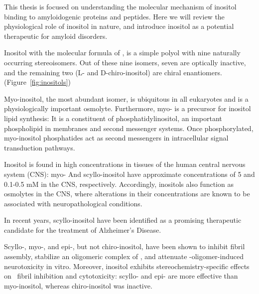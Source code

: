 This thesis is focused on understanding the molecular mechanism of inositol binding to amyloidogenic proteins and peptides. Here we will review the physiological role of inositol in nature, and introduce inositol as a potential therapeutic for amyloid disorders.

Inositol with the molecular formula of , is a simple polyol with nine naturally occurring stereoisomers. Out of these nine isomers, seven are optically inactive, and the remaining two (L- and D-chiro-inositol) are chiral enantiomers.(Figure~\ref{fig:inositols})


Myo-inositol, the most abundant isomer, is ubiquitous in all eukaryotes and is a physiologically important osmolyte.  Furthermore, myo- is a precursor for inositol lipid synthesis: It is a constituent of phosphatidylinositol, an important phospholipid in membranes and second messenger systems. Once phosphorylated, myo-inositol phosphatides act as second messengers in intracellular signal transduction pathways.\cite{Fisher:2002tk}

Inositol is found in high concentrations in tissues of the human central nervous system (CNS): myo- And scyllo-inositol have approximate concentrations of 5 and 0.1-0.5 mM in the CNS, respectively.\cite{Fisher:2002tk} Accordingly, inositols also function as osmolytes in the CNS, where alterations in their concentrations are known to be associated with neuropathological conditions.\cite{Michaelis:1993gf, Fisher:2002tk}

In recent years, scyllo-inositol have been identified as a promising therapeutic candidate for the treatment of Alzheimer's Disease.

Scyllo-, myo-, and epi-, but not chiro-inositol, have been shown to inhibit  fibril assembly, stabilize an oligomeric complex of , and attenuate \abeta-oligomer-induced neurotoxicity in vitro. Moreover, inositol exhibits stereochemistry-specific effects on \abeta\  fibril inhibition and cytotoxicity: scyllo- and epi- are more effective than myo-inositol, whereas chiro-inositol was inactive.\cite{McLaurin:2000bq}

